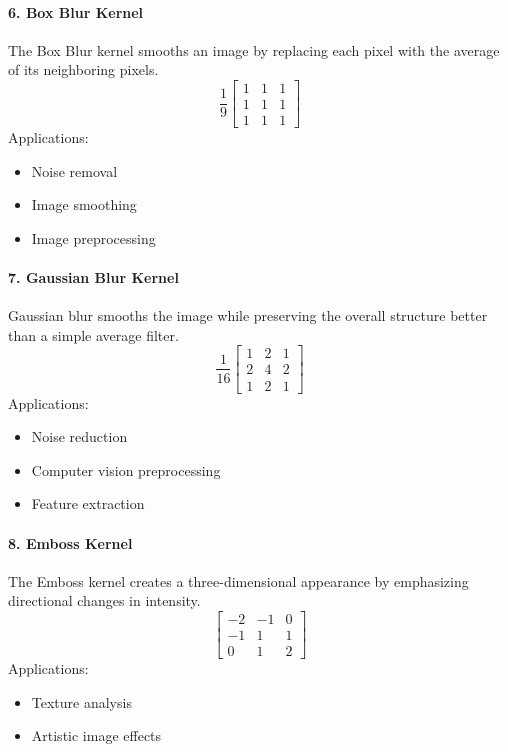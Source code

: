 \documentclass[11pt]{article}
\begin{document}
\vspace{3mm}
\paragraph{6. Box Blur Kernel}
The Box Blur kernel smooths an image by replacing each pixel with the average of its neighboring pixels.
\[
\frac{1}{9}\begin{bmatrix} 1 & 1 & 1 \\ 1 & 1 & 1 \\ 1 & 1 & 1 \end{bmatrix}
\]
Applications:
\begin{itemize}
\item Noise removal
\item Image smoothing
\item Image preprocessing
\end{itemize}

\vspace{3mm}
\paragraph{7. Gaussian Blur Kernel}
Gaussian blur smooths the image while preserving the overall structure better than a simple average filter.
\[
\frac{1}{16}\begin{bmatrix} 1 & 2 & 1 \\ 2 & 4 & 2 \\ 1 & 2 & 1 \end{bmatrix}
\]
Applications:
\begin{itemize}
\item Noise reduction
\item Computer vision preprocessing
\item Feature extraction
\end{itemize}

\vspace{3mm}
\paragraph{8. Emboss Kernel}
The Emboss kernel creates a three-dimensional appearance by emphasizing directional changes in intensity.
\[
\begin{bmatrix} -2 & -1 & 0 \\ -1 & 1 & 1 \\ 0 & 1 & 2 \end{bmatrix}
\]
Applications:
\begin{itemize}
\item Texture analysis
\item Artistic image effects
\end{itemize}
\end{document}
